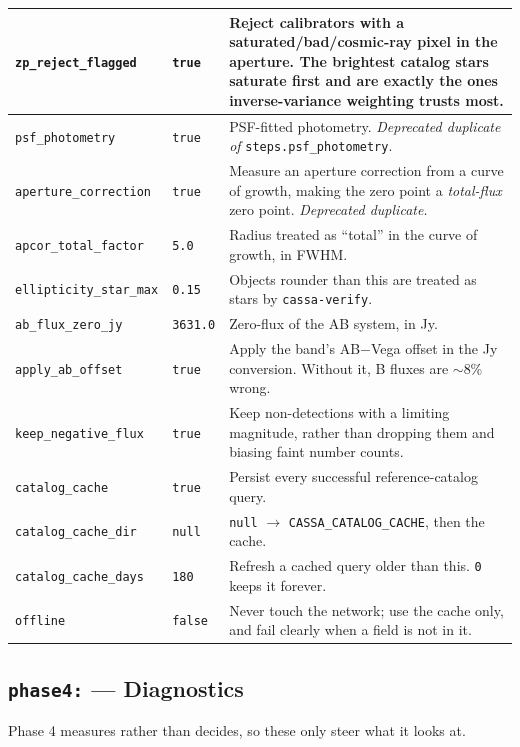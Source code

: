 \documentclass[11pt,a4paper]{article}
\begin{document}
\begin{center}
\begin{longtable}{|p{4.6cm}|p{1.9cm}|p{8.0cm}|}
\hline
\texttt{zp\_reject\_flagged} & \texttt{true} & Reject calibrators with a saturated/bad/cosmic-ray pixel in the aperture. The brightest catalog stars saturate first and are exactly the ones inverse-variance weighting trusts most. \\
\hline
\texttt{psf\_photometry} & \texttt{true} & PSF-fitted photometry. \emph{Deprecated duplicate of} \texttt{steps.psf\_photometry}. \\
\hline
\texttt{aperture\_correction} & \texttt{true} & Measure an aperture correction from a curve of growth, making the zero point a \emph{total-flux} zero point. \emph{Deprecated duplicate.} \\
\hline
\texttt{apcor\_total\_factor} & \texttt{5.0} & Radius treated as ``total'' in the curve of growth, in FWHM. \\
\hline
\texttt{ellipticity\_star\_max} & \texttt{0.15} & Objects rounder than this are treated as stars by \texttt{cassa-verify}. \\
\hline
\texttt{ab\_flux\_zero\_jy} & \texttt{3631.0} & Zero-flux of the AB system, in Jy. \\
\hline
\texttt{apply\_ab\_offset} & \texttt{true} & Apply the band's AB$-$Vega offset in the Jy conversion. Without it, B fluxes are $\sim$8\% wrong. \\
\hline
\texttt{keep\_negative\_flux} & \texttt{true} & Keep non-detections with a limiting magnitude, rather than dropping them and biasing faint number counts. \\
\hline
\texttt{catalog\_cache} & \texttt{true} & Persist every successful reference-catalog query. \\
\hline
\texttt{catalog\_cache\_dir} & \texttt{null} & \texttt{null} $\rightarrow$ \texttt{CASSA\_CATALOG\_CACHE}, then the cache. \\
\hline
\texttt{catalog\_cache\_days} & \texttt{180} & Refresh a cached query older than this. \texttt{0} keeps it forever. \\
\hline
\texttt{offline} & \texttt{false} & Never touch the network; use the cache only, and fail clearly when a field is not in it. \\
\hline
\end{longtable}
\end{center}

\subsection{\texttt{phase4:} --- Diagnostics}
Phase 4 measures rather than decides, so these only steer what it looks at.
\end{document}
